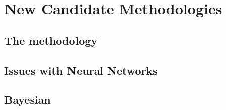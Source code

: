 
\chapter{New Candidate Methodologies}
\label{ch:gp}
\minitoc
\adjustmtc



\section[The NNPDF methodology]{The \nnpdf methodology}
\label{sec:gp/nnpdf}


\section{Issues with Neural Networks}
\label{sec:gp/issues}


\section{Bayesian \pdfs}
\label{sec:gp/bayesian}

